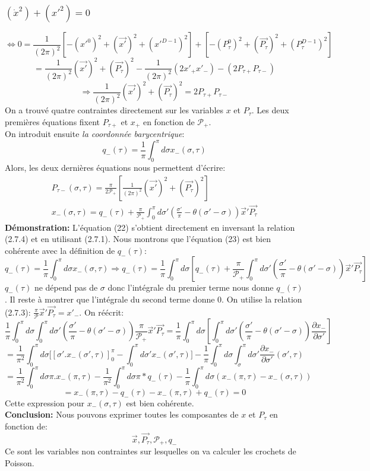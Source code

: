 \documentclass[a4paper,12pt]{article}
\def\vecx{\vec{x}}
\def\CP{\mathcal{P}}
\def\pt{P_\tau}
\def\vecpt{\vec{\pt}}
\begin{document}
\subsubsection{$(\dot{x}^2)+(x'^2)=0$}
$$\Leftrightarrow 0=\frac{1}{(2\pi)^2}\left[ -(x'^0)^2+(\vec{x'})^2 + (x'^{D-1})^2\right] +\left[ -(\pt^0)^2 +(\vec{P_\tau})^2 + (\pt^{D-1})^2\right] $$
$$=\frac{1}{(2\pi)^2}(\vec{x'})^2 + (\vec{P_\tau})^2 - \frac{1}{(2\pi)^2}\left( 2x'_+x'_-\right) - (2P_{\tau +}P_{\tau -})$$
$$\Rightarrow\boxed{\frac{1}{(2\pi)^2}(\vec{x'})^2 + (\vecpt)^2=2P_{\tau +}P_{\tau -}}$$
On a trouvé quatre contraintes directement sur les variables $x$ et $P_\tau$. Les deux premières équations fixent $P_{\tau +}$ et $x_+$ en fonction de $\CP_+$.\\
On introduit ensuite \textit{la coordonnée barycentrique}:
$$q_-(\tau)=\frac{1}{\pi}\int_0^\pi d\sigma x_-(\sigma,\tau)$$
Alors, les deux dernières équations nous permettent d'écrire:
\begin{align}
P_{\tau -}(\sigma,\tau)=\frac{\pi}{2\mathcal{P_+}}\left[\frac{1}{(2\pi)^2}(\vec{x'})^2 + (\vec{\pt})^2\right]\\
x_-(\sigma,\tau) = q_-(\tau) + \frac{\pi}{\mathcal{P_+}}\int_0^\pi d\sigma'\left( \frac{\sigma'}{\pi}-\theta(\sigma'-\sigma)\right) \vecx'\vecpt
\end{align}
\textbf{Démonstration:}
L'équation (22) s'obtient directement en inversant la relation (2.7.4) et en utilisant (2.7.1). Nous montrons que l'équation (23) est bien cohérente avec la définition de $q_-(\tau)$:
$$q_-(\tau)=\frac{1}{\pi}\int_0^\pi d\sigma x_-(\sigma,\tau)
\Rightarrow q_-(\tau)=\frac{1}{\pi}\int_0^\pi d\sigma\left[ q_-(\tau) + \frac{\pi}{\mathcal{P_+}}\int_0^\pi d\sigma'\left( \frac{\sigma'}{\pi}-\theta(\sigma'-\sigma)\right) \vecx'\vecpt\right] $$
$q_-(\tau)$ ne dépend pas de $\sigma$ donc l'intégrale du premier terme nous donne $q_-(\tau)$. Il reste à montrer que l'intégrale du second terme donne 0. On utilise la relation (2.7.3): $\frac{\pi}{\CP}\vecx'\vecpt=x'_-$.
On réécrit: 
$$\frac{1}{\pi}\int_0^\pi d\sigma \int_0^\pi d\sigma'\left( \frac{\sigma'}{\pi}-\theta(\sigma'-\sigma)\right) \frac{\pi}{\mathcal{P_+}}\vecx'\vecpt =\frac{1}{\pi}\int_0^\pi d\sigma\left[ \int_0^\pi d\sigma'\left( \frac{\sigma'}{\pi}-\theta(\sigma'-\sigma)\right) \frac{\partial x_-}{\partial \sigma'}\right]$$
$$=\frac{1}{\pi^2}\int_0^\pi d\sigma\Big[\left[\sigma'.x_-(\sigma',\tau)\right]^\pi_0 - \int_0^\pi d\sigma' x_-(\sigma',\tau)\Big] - \frac{1}{\pi}\int_0^\pi d\sigma\int_\sigma^\pi d\sigma'\frac{\partial x_-}{\partial \sigma'}(\sigma',\tau)$$
$$=\frac{1}{\pi^2}\int_0^\pi d\sigma \pi.x_-(\pi,\tau)-\frac{1}{\pi^2}\int_0^\pi d\sigma \pi*q_-(\tau) - \frac{1}{\pi}\int_0^\pi d\sigma\left( x_-(\pi,\tau)-x_-(\sigma,\tau)\right) $$
$$= x_-(\pi,\tau)-q_-(\tau) -  x_-(\pi,\tau)+q_-(\tau) = 0$$
Cette expression pour $x_-(\sigma,\tau)$ est bien cohérente.\\
\textbf{Conclusion:} Nous pouvons  exprimer toutes les composantes de $x$ et $\pt$ en fonction de:
$$\boxed{\vecx, \vecpt, \CP_+, q_-}$$
Ce sont les variables non contraintes sur lesquelles on va calculer les crochets de Poisson. 
\end{document}
